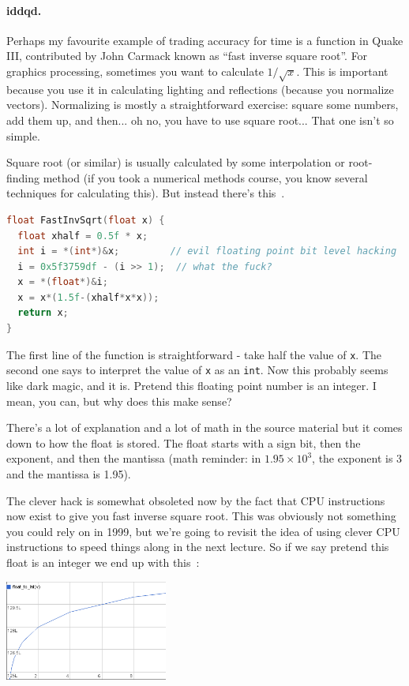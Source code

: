 \documentclass[a4paper]{report}
\begin{document}
\paragraph{iddqd.} Perhaps my favourite example of trading accuracy for time is a function in Quake III, contributed by John Carmack known as ``fast inverse square root''. For graphics processing, sometimes you want to calculate $1/\sqrt{x}$. This is important because you use it in calculating lighting and reflections (because you normalize vectors). Normalizing is mostly a straightforward exercise: square some numbers, add them up, and then... oh no, you have to use square root... That one isn't so simple.

Square root (or similar) is usually calculated by some interpolation or root-finding method (if you took a numerical methods course, you know several techniques for calculating this). But instead there's this~\cite{fisqrt}. 

\begin{lstlisting}[language=C]
float FastInvSqrt(float x) {
  float xhalf = 0.5f * x;
  int i = *(int*)&x;         // evil floating point bit level hacking
  i = 0x5f3759df - (i >> 1);  // what the fuck?
  x = *(float*)&i;
  x = x*(1.5f-(xhalf*x*x));
  return x;
}
\end{lstlisting}

The first line of the function is straightforward - take half the value of \texttt{x}. The second one says to interpret the value of \texttt{x} as an \texttt{int}. Now this probably seems like dark magic, and it is. Pretend this floating point number is an integer. I mean, you can, but why does this make sense? 

There's a lot of explanation and a lot of math in the source material but it comes down to how the float is stored. The float starts with a sign bit, then the exponent, and then the mantissa (math reminder: in $1.95 \times 10^{3}$, the exponent is 3 and the mantissa is 1.95).

The clever hack is somewhat obsoleted now by the fact that CPU instructions now exist to give you fast inverse square root. This was obviously not something you could rely on in 1999, but we're going to revisit the idea of using clever CPU instructions to speed things along in the next lecture. So if we say pretend this float is an integer we end up with this~\cite{fisqrt2}:

\begin{center}
	\includegraphics[width=0.4\textwidth]{images/float-to-int.png}
\end{center}
\end{document}
